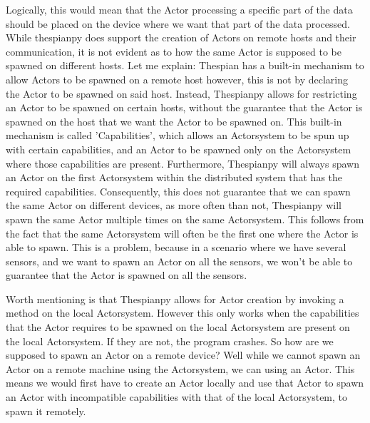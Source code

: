 \documentclass[a4paper]{article}
\begin{document}
Logically, this would mean that the Actor processing a specific part of the data should be placed on the device where we want that part of the data processed. While thespianpy does support the creation of Actors on remote hosts and their communication, it is not evident as to how the same Actor is supposed to be spawned on different hosts. Let me explain: Thespian has a built-in mechanism to allow Actors to be spawned on a remote host however, this is not by declaring the Actor to be spawned on said host. Instead, Thespianpy allows for restricting an Actor to be spawned on certain hosts, without the guarantee that the Actor is spawned on the host that we want the Actor to be spawned on. This built-in mechanism is called 'Capabilities', which allows an Actorsystem to be spun up with certain capabilities, and an Actor to be spawned only on the Actorsystem where those capabilities are present. Furthermore, Thespianpy will always spawn an Actor on the first Actorsystem within the distributed system that has the required capabilities. Consequently, this does not guarantee that we can spawn the same Actor on different devices, as more often than not, Thespianpy will spawn the same Actor multiple times on the same Actorsystem. This follows from the fact that the same Actorsystem will often be the first one where the Actor is able to spawn. This is a problem, because in a scenario where we have several sensors, and we want to spawn an Actor on all the sensors, we won't be able to guarantee that the Actor is spawned on all the sensors.

Worth mentioning is that Thespianpy allows for Actor creation by invoking a method on the local Actorsystem. However this only works when the capabilities that the Actor requires to be spawned on the local Actorsystem are present on the local Actorsystem. If they are not, the program crashes. So how are we supposed to spawn an Actor on a remote device? Well while we cannot spawn an Actor on a remote machine using the Actorsystem, we can using an Actor. This means we would first have to create an Actor locally and use that Actor to spawn an Actor with incompatible capabilities with that of the local Actorsystem, to spawn it remotely.
\end{document}
